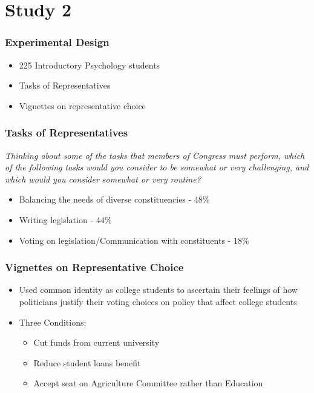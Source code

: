 \documentclass[14pt]{beamer}
\newcommand\e{\emph}
\begin{document}
\section{Study 2}
\begin{frame}
\frametitle{Experimental Design}
\begin{itemize}
	\item 225 Introductory Psychology students
	\item Tasks of Representatives
	\item Vignettes on representative choice
\end{itemize}
\end{frame}

\begin{frame}
\frametitle{Tasks of Representatives}
\small
\begin{center}
	\e{Thinking about some of the tasks that members of Congress must perform, which of the following tasks would you consider to be somewhat or very challenging, and which would you consider somewhat or very routine?}
\end{center}
\begin{itemize}
	\item Balancing the needs of diverse constituencies - 48\% 
	\item Writing legislation - 44\%
	\item Voting on legislation/Communication with constituents - 18\%
\end{itemize}
\end{frame}

\begin{frame}
\frametitle{Vignettes on Representative Choice}
\begin{itemize}
	\item Used common identity as college students to ascertain their feelings of how politicians justify their voting choices on policy that affect college students
	\item Three Conditions:
	\begin{itemize}
		\item Cut funds from current university
		\item Reduce student loans benefit
		\item Accept seat on Agriculture Committee rather than Education
	\end{itemize}
\end{itemize}
\end{frame}
\end{document}
